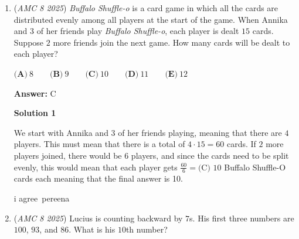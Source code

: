\begin{enumerate}
 \textbf{Answer: }B



\textbf{Solution 1}

The first hieroglyph is worth $10,000$, the next 4 are worth $100 \cdot 4 = 400$, the next $2$ are worth $10 \cdot 2 = 20$, and the last $3$ are worth $1 \cdot 3 = 3$. Therefore, the answer is $10,000 + 400 + 20 + 3 = \boxed{\textbf{(B)}\ 10,423}$




\textbf{Solution 2}

\( 1 \cdot 10^4 + 0 \cdot 10^3 + 4 \cdot 10^2 + 2 \cdot 10^1 + 3 \cdot 10^0 = 10423 \)

 



\textbf{Solution 3 (fast version of Solution x)}

From a first inspection, you may notice that there is no thousands hieroglyph. The only option with zero in the thousands place is $\boxed{\textbf{(B)}\ 10,423}$



	\item (\textit{AMC 8 2025}) \textit{Buffalo Shuffle-o} is a card game in which all the cards are distributed evenly among all players at the start of the game. When Annika and $3$ of her friends play \textit{Buffalo Shuffle-o}, each player is dealt $15$ cards. Suppose $2$ more friends join the next game. How many cards will be dealt to each player?


 $\textbf{(A)}\ 8 \qquad \textbf{(B)}\ 9 \qquad \textbf{(C)}\ 10 \qquad \textbf{(D)}\ 11 \qquad \textbf{(E)}\ 12$

 \textbf{Answer: }C



\textbf{Solution 1}

We start with Annika and $3$ of her friends playing, meaning that there are $4$ players. This must mean that there is a total of $4 \cdot 15 = 60$ cards. If $2$ more players joined, there would be $6$ players, and since the cards need to be split evenly, this would mean that each player gets $\frac{60}{6}=\boxed{\text{(C)\ 10}}$ Buffalo Shuffle-O cards each meaning that the final answer is 10.

 i agree~pereena

 


	\item (\textit{AMC 8 2025}) Lucius is counting backward by $7$s. His first three numbers are $100$, $93$, and $86$. What is his $10$th number?



\end{enumerate}
